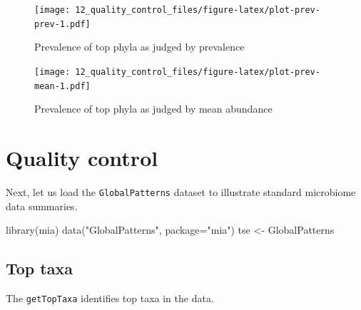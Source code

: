 \documentclass[
]{book}
\newenvironment{Shaded}{\begin{snugshade}}{\end{snugshade}}
\newcommand{\AttributeTok}[1]{\textcolor[rgb]{0.77,0.63,0.00}{#1}}
\newcommand{\FunctionTok}[1]{\textcolor[rgb]{0.00,0.00,0.00}{#1}}
\newcommand{\NormalTok}[1]{#1}
\newcommand{\OtherTok}[1]{\textcolor[rgb]{0.56,0.35,0.01}{#1}}
\newcommand{\SpecialCharTok}[1]{\textcolor[rgb]{0.00,0.00,0.00}{#1}}
\newcommand{\StringTok}[1]{\textcolor[rgb]{0.31,0.60,0.02}{#1}}
\begin{document}
\begin{figure}
\centering
\texttt{[image: 12\_quality\_control\_files/figure-latex/plot-prev-prev-1.pdf]}
\caption{\label{fig:plot-prev-prev}Prevalence of top phyla as judged by prevalence}
\end{figure}

\begin{Shaded}
\end{Shaded}

\begin{figure}
\centering
\texttt{[image: 12\_quality\_control\_files/figure-latex/plot-prev-mean-1.pdf]}
\caption{\label{fig:plot-prev-mean}Prevalence of top phyla as judged by mean abundance}
\end{figure}

\hypertarget{qc}{%
\section{Quality control}\label{qc}}

Next, let us load the \texttt{GlobalPatterns} dataset to illustrate standard
microbiome data summaries.

\begin{Shaded}
\begin{Highlighting}[]
\FunctionTok{library}\NormalTok{(mia)}
\FunctionTok{data}\NormalTok{(}\StringTok{"GlobalPatterns"}\NormalTok{, }\AttributeTok{package=}\StringTok{"mia"}\NormalTok{)}
\NormalTok{tse }\OtherTok{\textless{}{-}}\NormalTok{ GlobalPatterns }
\end{Highlighting}
\end{Shaded}

\hypertarget{top-taxa}{%
\subsection{Top taxa}\label{top-taxa}}

The \texttt{getTopTaxa} identifies top taxa in the data.
\end{document}
